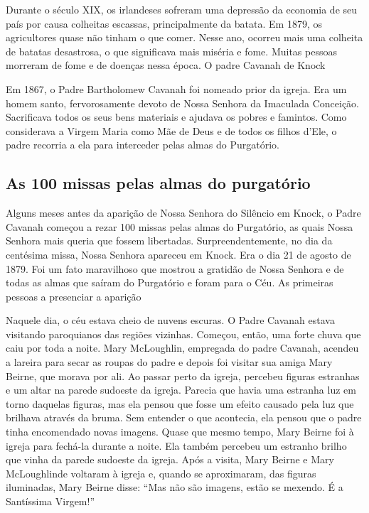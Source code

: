 \documentclass[a4paper,14pt]{extarticle} \usepackage[utf8]{inputenc}
\begin{document}
Durante o século XIX, os irlandeses sofreram uma depressão da economia de seu país por causa colheitas escassas, principalmente da batata. Em 1879, os agricultores quase não tinham o que comer. Nesse ano, ocorreu mais uma colheita de batatas desastrosa, o que significava mais miséria e fome. Muitas pessoas morreram de fome e de doenças nessa época.
O padre Cavanah de Knock

Em 1867, o Padre Bartholomew Cavanah foi nomeado prior da igreja. Era um homem santo, fervorosamente devoto de Nossa Senhora da Imaculada Conceição. Sacrificava todos os seus bens materiais e ajudava os pobres e famintos. Como considerava a Virgem Maria como Mãe de Deus e de todos os filhos d’Ele, o padre recorria a ela para interceder pelas almas do Purgatório.

\subsection{As 100 missas pelas almas do purgatório}

Alguns meses antes da aparição de Nossa Senhora do Silêncio em Knock, o Padre Cavanah começou a rezar 100 missas pelas almas do Purgatório, as quais Nossa Senhora mais queria que fossem libertadas. Surpreendentemente, no dia da centésima missa, Nossa Senhora apareceu em Knock. Era o dia 21 de agosto de 1879. Foi um fato maravilhoso que mostrou a gratidão de Nossa Senhora e de todas as almas que saíram do Purgatório e foram para o Céu.
As primeiras pessoas a presenciar a aparição

Naquele dia, o céu estava cheio de nuvens escuras. O Padre Cavanah estava visitando paroquianos das regiões vizinhas. Começou, então, uma forte chuva que caiu por toda a noite. Mary McLoughlin, empregada do padre Cavanah, acendeu a lareira para secar as roupas do padre e depois foi visitar sua amiga Mary Beirne, que morava por ali. Ao passar perto da igreja, percebeu figuras estranhas e um altar na parede sudoeste da igreja. Parecia que havia uma estranha luz em torno daquelas figuras, mas ela pensou que fosse um efeito causado pela luz que brilhava através da bruma. Sem entender o que acontecia, ela pensou que o padre tinha encomendado novas imagens. Quase que mesmo tempo, Mary Beirne foi à igreja para fechá-la durante a noite. Ela também percebeu um estranho brilho que vinha da parede sudoeste da igreja. Após a visita, Mary Beirne e Mary McLoughlinde voltaram à igreja e, quando se aproximaram, das figuras iluminadas, Mary Beirne disse: “Mas não são imagens, estão se mexendo. É a Santíssima Virgem!”
\end{document}
